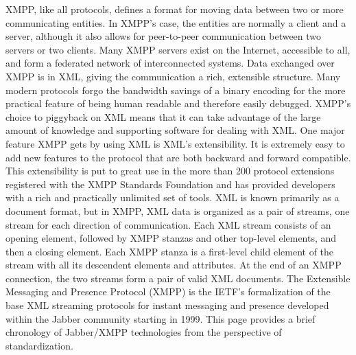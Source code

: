     XMPP, like all protocols, defines a format for moving data between two or more communicating entities. In XMPP’s case, the entities are normally a client and a server, although it also allows for peer-to-peer communication between two servers or two clients. Many XMPP servers exist on the Internet, accessible to all, and form a federated network of interconnected systems. Data exchanged over XMPP is in XML, giving the communication a rich, extensible structure. Many modern protocols forgo the bandwidth savings of a binary encoding for the more practical feature of being human readable and therefore easily debugged. XMPP’s choice to piggyback on XML means that it can take advantage of the large amount of knowledge and supporting software for dealing with XML. One major feature XMPP gets by using XML is XML’s extensibility. It is extremely easy to add new features to the protocol that are both backward and forward compatible. This extensibility is put to great use in the more than 200 protocol extensions registered with the XMPP Standards Foundation and has provided developers with a rich and practically unlimited set of tools. XML is known primarily as a document format, but in XMPP, XML data is organized as a pair of streams, one stream for each direction of communication. Each XML stream consists of an opening element, followed by XMPP stanzas and other top-level elements, and then a closing element. Each XMPP stanza is a first-level child element of the stream with all its descendent elements and attributes. At the end of an XMPP connection, the two streams form a pair of valid XML documents.
    The Extensible Messaging and Presence Protocol (XMPP) is the IETF’s formalization of the base XML streaming protocols for instant messaging and presence developed within the Jabber community starting in 1999. This page provides a brief chronology of Jabber/XMPP technologies from the perspective of standardization\cite{xmpp}.
